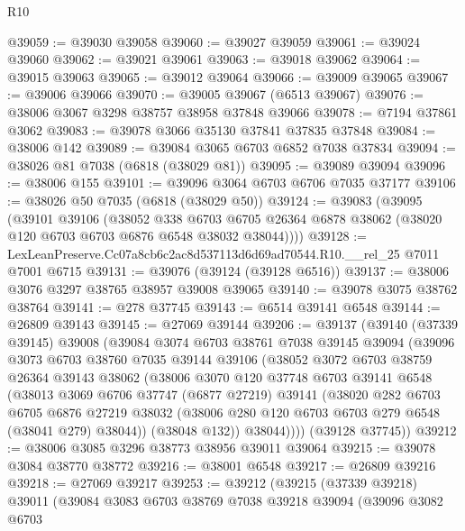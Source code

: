 \begin{lexlean}{R10}
\begin{coremodule}
@39059 := @39030 @39058
@39060 := @39027 @39059
@39061 := @39024 @39060
@39062 := @39021 @39061
@39063 := @39018 @39062
@39064 := @39015 @39063
@39065 := @39012 @39064
@39066 := @39009 @39065
@39067 := @39006 @39066
@39070 := @39005 @39067 (@6513 @39067)
@39076 := @38006 @3067 @3298 @38757 @38958 @37848 @39066
@39078 := @7194 @37861 @3062
@39083 := @39078 @3066 @35130 @37841 @37835 @37848
@39084 := @38006 @142
@39089 := @39084 @3065 @6703 @6852 @7038 @37834
@39094 := @38026 @81 @7038 (@6818 (@38029 @81))
@39095 := @39089 @39094
@39096 := @38006 @155
@39101 := @39096 @3064 @6703 @6706 @7035 @37177
@39106 := @38026 @50 @7035 (@6818 (@38029 @50))
@39124 := @39083
    (@39095
      (@39101
        @39106
        (@38052
          @338
          @6703
          @6705
          @26364
          @6878
          @38062
          (@38020 @120 @6703 @6703 @6876 @6548 @38032 @38044))))
@39128 := LexLeanPreserve.Cc07a8cb6c2ac8d537113d6d69ad70544.R10.__rel_25 @7011 @7001 @6715
@39131 := @39076 (@39124 (@39128 @6516))
@39137 := @38006 @3076 @3297 @38765 @38957 @39008 @39065
@39140 := @39078 @3075 @38762 @38764
@39141 := @278 @37745
@39143 := @6514 @39141 @6548
@39144 := @26809 @39143
@39145 := @27069 @39144
@39206 := @39137
    (@39140
      (@37339 @39145)
      @39008
      (@39084
        @3074
        @6703
        @38761
        @7038
        @39145
        @39094
        (@39096
          @3073
          @6703
          @38760
          @7035
          @39144
          @39106
          (@38052
            @3072
            @6703
            @38759
            @26364
            @39143
            @38062
            (@38006
              @3070
              @120
              @37748
              @6703
              @39141
              @6548
              (@38013
                @3069
                @6706
                @37747
                (@6877 @27219)
                @39141
                (@38020
                  @282
                  @6703
                  @6705
                  @6876
                  @27219
                  @38032
                  (@38006 @280 @120 @6703 @6703 @279 @6548 (@38041 @279) @38044))
                (@38048 @132))
              @38044))))
      (@39128 @37745))
@39212 := @38006 @3085 @3296 @38773 @38956 @39011 @39064
@39215 := @39078 @3084 @38770 @38772
@39216 := @38001 @6548
@39217 := @26809 @39216
@39218 := @27069 @39217
@39253 := @39212
    (@39215
      (@37339 @39218)
      @39011
      (@39084
        @3083
        @6703
        @38769
        @7038
        @39218
        @39094
        (@39096
          @3082
          @6703

\end{coremodule}
\end{lexlean}
